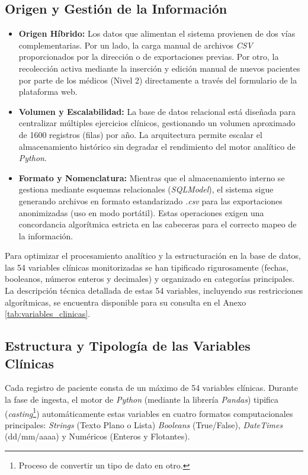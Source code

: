 \subsection{Origen y Gestión de la Información}
\begin{itemize}
    \item \textbf{Origen Híbrido:} Los datos que alimentan el sistema provienen de dos vías complementarias. Por un lado, la carga manual de archivos \textit{CSV} proporcionados por la dirección o de exportaciones previas. Por otro, la recolección activa mediante la inserción y edición manual de nuevos pacientes por parte de los médicos (Nivel 2) directamente a través del formulario de la plataforma web.
    \item \textbf{Volumen y Escalabilidad:} La base de datos relacional está diseñada para centralizar múltiples ejercicios clínicos, gestionando un volumen aproximado de 1600 registros (filas) por año. La arquitectura permite escalar el almacenamiento histórico sin degradar el rendimiento del motor analítico de \textit{Python}.
    \item \textbf{Formato y Nomenclatura:} Mientras que el almacenamiento interno se gestiona mediante esquemas relacionales (\textit{SQLModel}), el sistema sigue generando archivos en formato estandarizado \textit{.csv} para las exportaciones anonimizadas (uso en modo portátil). Estas operaciones exigen una concordancia algorítmica estricta en las cabeceras para el correcto mapeo de la información.
\end{itemize}

Para optimizar el procesamiento analítico y la estructuración en la base de datos, las 54 variables clínicas monitorizadas se han tipificado rigurosamente (fechas, booleanos, números enteros y decimales) y organizado en categorías principales. La descripción técnica detallada de estas 54 variables, incluyendo sus restricciones algorítmicas, se encuentra disponible para su consulta en el Anexo \ref{tab:variables_clinicas}.

\subsection{Estructura y Tipología de las Variables Clínicas}
Cada registro de paciente consta de un máximo de 54 variables clínicas. Durante la fase de ingesta, el motor de \textit{Python} (mediante la librería \textit{Pandas}) tipifica (\textit{casting}\footnote{Proceso de convertir un tipo de dato en otro.}) automáticamente estas variables en cuatro formatos computacionales principales: \textit{Strings} (Texto Plano o Lista) \textit{Booleans} (True/False), \textit{DateTimes} (dd/mm/aaaa) y Numéricos (Enteros y Flotantes). 

